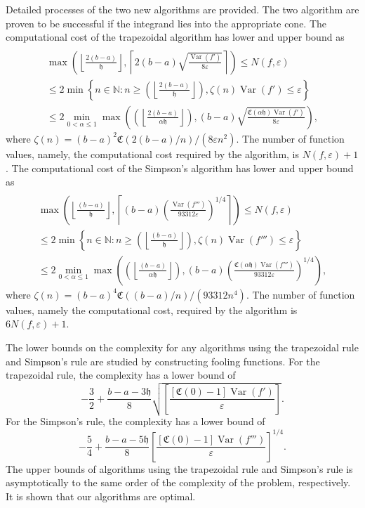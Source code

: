 \documentclass{iitthesis}
\DeclareMathOperator{\Var}{Var}
\theoremstyle{definition}
\theoremstyle{remark}
\begin{document}
Detailed processes of the two new algorithms are provided. The two algorithm are proven to be successful if the integrand lies into the appropriate cone. The computational cost of the trapezoidal algorithm has lower and upper bound as
\begin{multline*}\\
        \max\left(\left\lfloor\frac{2(b-a)}{\mathfrak{h}}\right\rfloor,\left\lceil2(b-a)\sqrt{\frac{\Var(f')}{8\varepsilon}}\right\rceil\right)\leq N(f,\varepsilon)\\ \leq 2\min\left\{n\in\mathbb{N}:n\geq\left(\left\lfloor\frac{2(b-a)}{\mathfrak{h}}\right\rfloor\right),\zeta(n)\Var(f')\leq\varepsilon\right\}\\ \leq 2\min_{0<\alpha\leq1}\max\left(\left(\left\lfloor\frac{2(b-a)}{\alpha\mathfrak{h}}\right\rfloor\right),(b-a)\sqrt{\frac{\mathfrak{C}(\alpha\mathfrak{h})\Var(f')}{8\varepsilon}}\right),
    \end{multline*}
    where $\zeta(n)=(b-a)^2\mathfrak{C}(2(b-a)/n)/(8\varepsilon n^2)$. The number of function values, namely, the computational cost required by the algorithm, is $N(f,\varepsilon)+1$.
    The computational cost of the Simpson's algorithm has lower and upper bound as
    \begin{multline*}\\
         \max\left(\left\lfloor\frac{(b-a)}{\mathfrak{h}}\right\rfloor,\left\lceil(b-a)\left(\frac{\Var(f''')}{93312\varepsilon}\right)^{1/4}\right\rceil\right)\leq N(f,\varepsilon)\\ \leq 2\min\left\{n\in\mathbb{N}:n\geq\left(\left\lfloor\frac{(b-a)}{\mathfrak{h}}\right\rfloor\right),\zeta(n)\Var(f''')\leq\varepsilon\right\}\\ \leq 2\min_{0<\alpha\leq1}\max\left(\left(\left\lfloor\frac{(b-a)}{\alpha\mathfrak{h}}\right\rfloor\right),(b-a)\left(\frac{\mathfrak{C}(\alpha\mathfrak{h})\Var(f''')}{93312\varepsilon}\right)^{1/4}\right),
    \end{multline*}
  where $\zeta(n)=(b-a)^4\mathfrak{C}((b-a)/n)/(93312n^4)$. The number of function values, namely the computational cost, required by the algorithm is $6N(f,\varepsilon)+1$.

The lower bounds on the complexity for any algorithms using the trapezoidal rule and Simpson's rule are studied by constructing fooling functions. For the trapezoidal rule, the complexity has a lower bound of
$$
     -\frac{3}{2}+\frac{b-a-3\mathfrak{h}}{8}\sqrt{\left[\frac{[\mathfrak{C}(0)-1]\Var( f')}{\varepsilon}\right]}.
$$
For the Simpson's rule, the complexity has a lower bound of
$$
     -\frac{5}{4}+\frac{b-a-5\mathfrak{h}}{8}\left[\frac{[\mathfrak{C}(0)-1]\Var( f''')}{\varepsilon}\right]^{1/4}.
$$
The upper bounds of algorithms using the trapezoidal rule and Simpson's rule is asymptotically to the same order of the complexity of the problem, respectively. It is shown that our algorithms are optimal.
\end{document}
